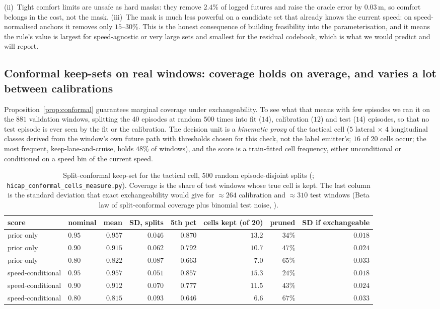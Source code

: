 (ii)~Tight comfort limits are unsafe as hard masks: they remove $2.4\%$ of logged futures and raise the oracle error by $0.03$\,m, so comfort belongs in the cost, not the mask. (iii)~The mask is much less powerful on a candidate set that already knows the current speed: on speed-normalised anchors it removes only $15$--$30\%$. This is the honest consequence of building feasibility into the parameterisation, and it means the rule's value is largest for speed-agnostic or very large sets and smallest for the residual codebook, which is what we would predict and will report.

\subsection{Conformal keep-sets on real windows: coverage holds on average, and varies a lot between calibrations}
\label{sec:prelim-conformal}
Proposition~\ref{prop:conformal} guarantees marginal coverage under exchangeability. To see what that means with few episodes we ran it on the $881$ validation windows, splitting the $40$ episodes at random $500$ times into fit ($14$), calibration ($12$) and test ($14$) episodes, so that no test episode is ever seen by the fit or the calibration.
The decision unit is a \emph{kinematic proxy} of the tactical cell ($5$ lateral $\times$ $4$ longitudinal classes derived from the window's own future path with thresholds chosen for this check, not the label emitter's; $16$ of $20$ cells occur; the most frequent, keep-lane-and-cruise, holds $48\%$ of windows), and the score is a train-fitted cell frequency, either unconditional or conditioned on a speed bin of the current speed.
\begin{table}[h]
\centering\small
\caption{Split-conformal keep-set for the tactical cell, 500 random episode-disjoint splits (\evM; \texttt{hicap\_conformal\_cells\_measure.py}). Coverage is the share of test windows whose true cell is kept. The last column is the standard deviation that exact exchangeability would give for $\approx264$ calibration and $\approx310$ test windows (Beta law of split-conformal coverage plus binomial test noise, \evE).}
\label{tab:conformal}
\begin{tabular}{@{}llrrrrrr@{}}
\toprule
score & nominal & mean & SD, splits & 5th pct & cells kept (of 20) & pruned & SD if exchangeable \\ \midrule
prior only & $0.95$ & $0.957$ & $0.046$ & $0.870$ & $13.2$ & $34\%$ & $0.018$ \\
prior only & $0.90$ & $0.915$ & $0.062$ & $0.792$ & $10.7$ & $47\%$ & $0.024$ \\
prior only & $0.80$ & $0.822$ & $0.087$ & $0.663$ & $7.0$ & $65\%$ & $0.033$ \\
speed-conditional & $0.95$ & $0.957$ & $0.051$ & $0.857$ & $15.3$ & $24\%$ & $0.018$ \\
speed-conditional & $0.90$ & $0.912$ & $0.070$ & $0.777$ & $11.5$ & $43\%$ & $0.024$ \\
speed-conditional & $0.80$ & $0.815$ & $0.093$ & $0.646$ & $6.6$ & $67\%$ & $0.033$ \\
\bottomrule
\end{tabular}
\end{table}
